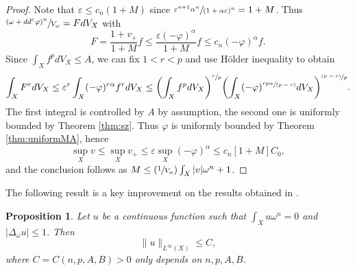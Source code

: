\documentclass[JEP,XML,SOM,Unicode,published]{cedram}
\newcommand{\Psfrac}[2]{(\sfrac{#1}{#2})}
\newcommand{\psfrac}[2]{\sfrac{(#1)}{#2}}
\newcommand{\spfrac}[2]{\sfrac{#1}{(#2)}}
\newtheorem{prop}[theorem]{Proposition}
\theoremstyle{definition}
\let\e\varepsilon
\let\f\varphi
\begin{document}
\begin{proof}
Note that $\e \leq c_n (1+M)$ since $\sfrac{\e^{n+1}\alpha^n}{(1+\alpha \e)^n}=1+M$.
Thus $\sfrac{(\omega+dd^c \f)^n}{V_{\omega}}=F dV_X$
with
\[
F=\frac{1+v_+}{1+M} f \leq \frac{\e (-\f)^{\alpha}}{1+M} f \leq c_n (-\f)^{\alpha} f.
\]
Since $\int_X f^p dV_X \leq A$,
we can fix $1<r<p$ and use
Hölder inequality to obtain
\[
\int_X F^r dV_X \leq \e^r \int_X (-\f)^{r\alpha} f^r dV_X \leq
\biggl( \int_X f^p dV_X \biggr)^{\sfrac{r}{p}}
\biggl( \int_X (-\f)^{\spfrac{rp\alpha}{p-r}} dV_X \biggr)^{\psfrac{p-r}{p}}.
\]
The first integral is controlled by $A$ by assumption, the second one is uniformly bounded by Theorem \ref{thm:sz}.
Thus $\f$ is uniformly bounded by Theorem \ref{thm:uniformMA}, hence
\[
\sup_X v \leq \sup_X v_+ \leq \e \sup_X (-\f)^{\alpha} \leq c_n [1+M] C_0,
\]
and the conclusion follows as $M\leq \Psfrac{1}{V_\omega} \int_X |v| \omega^n+1$.
\end{proof}

The following result is a key improvement on the results obtained in \cite{GPSS22}.

\begin{prop} \label{prop:key}
Let $u$ be a continuous function such that $\int_X\! u \omega^n\!=\!0$
and~\hbox{$|\Delta_{\omega} u| \!\leq\! 1$}. Then
\[
\|u\|_{L^{\infty}(X)} \leq C,
\]
where $C=C(n,p,A,B)>0$ only depends on $n,p,A,B$.
\end{prop}
\end{document}
